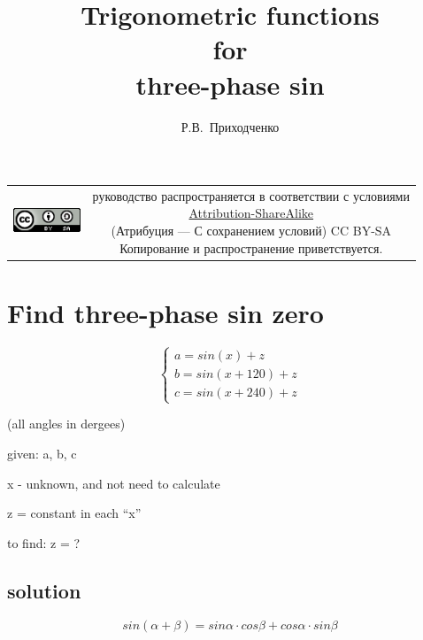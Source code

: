 \documentclass[unicode, 12pt, a4paper]{article}
\author{Р.В.~Приходченко}
\title{Trigonometric functions\\for\\three-phase sin}
\begin{document}
\maketitle



\begin{table}[ht]
  \begin{tabular}{cc}
    \includegraphics[width=2cm]{../CC_BY-SA_88x31.png} &
    \shortstack{руководство распространяется в соответствии с
      условиями\\
      \href{http://creativecommons.org/licenses/by-sa/3.0/}{Attribution-ShareAlike} \\
      (Атрибуция — С сохранением условий) CC BY-SA \\
      Копирование и распространение приветствуется.}
  \end{tabular}
\end{table}



\section{Find three-phase sin zero}

\begin{equation}
  \label{eq:zero-shift:three-phase-case}
  \begin{cases}
    a = sin(x)       + z\\
    b = sin(x + 120) + z\\
    c = sin(x + 240) + z
  \end{cases}
\end{equation}

(all angles in dergees)

given: a, b, c

x - unknown, and not need to calculate

z = constant in each ``x''

to find: z = ?


\subsection{solution}

\begin{equation}
  \label{eq:trigonometric:rule:sin-a-b}
    sin (\alpha + \beta) = sin \alpha \cdot cos \beta + cos \alpha \cdot sin \beta
\end{equation}
\end{document}
